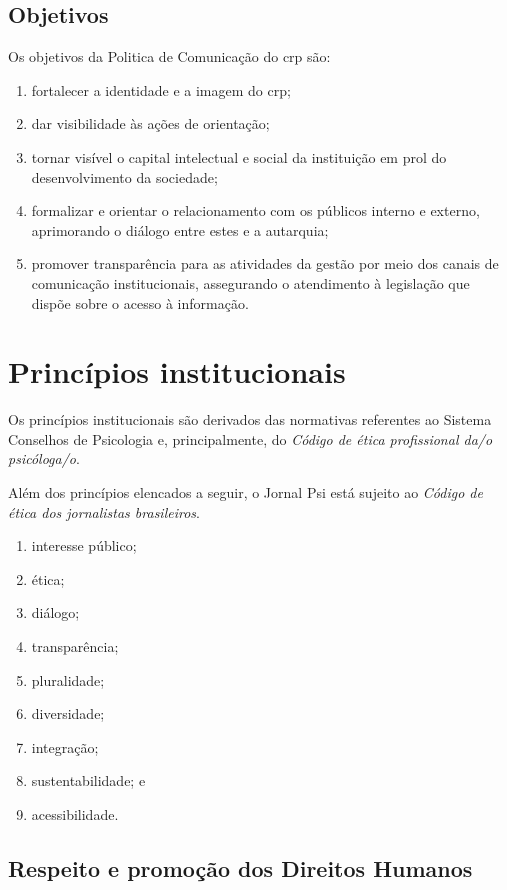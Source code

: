 \subsection{Objetivos}

Os objetivos da Politica de Comunicação do \ac{crp} são:

\begin{enumerate}
	\item fortalecer a identidade e a imagem do \ac{crp};
	\item dar visibilidade às ações de orientação;
	\item tornar visível o capital intelectual e social da instituição em prol do desenvolvimento da sociedade;
	\item formalizar e orientar o relacionamento com os públicos interno e externo, aprimorando o diálogo entre estes e a autarquia;
	\item promover transparência para as atividades da gestão por meio dos canais de comunicação institucionais, assegurando o atendimento à legislação que dispõe sobre o acesso à informação.
\end{enumerate}

\section{Princípios institucionais}

Os princípios institucionais são derivados das normativas referentes ao Sistema Conselhos de Psicologia e, principalmente, do \emph{Código de ética profissional da/o psicóloga/o}.

Além dos princípios elencados a seguir, o Jornal Psi está sujeito ao \emph{Código de ética dos jornalistas brasileiros}.

\begin{enumerate}
\item interesse público;
\item ética;
\item diálogo;
\item transparência;
\item pluralidade;
\item diversidade;
\item integração;
\item sustentabilidade; e
\item acessibilidade.
\end{enumerate}

\subsection{Respeito e promoção dos Direitos Humanos}

